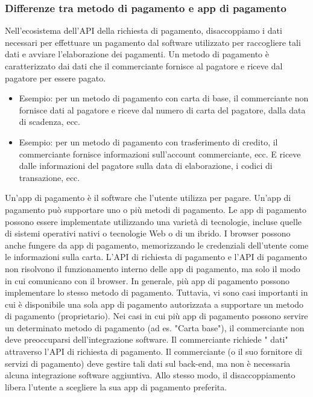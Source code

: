 \documentclass[italian]{article}
\begin{document}
	
	\subsubsection{Differenze tra metodo di pagamento e app di pagamento}
	Nell'ecosistema dell'API della richiesta di pagamento, disaccoppiamo i dati necessari per effettuare un pagamento dal software utilizzato per raccogliere tali dati e avviare l'elaborazione dei pagamenti.
	Un metodo di pagamento è caratterizzato dai dati che il commerciante fornisce al pagatore e riceve dal pagatore per essere pagato.
	\begin{itemize}
	\item Esempio: per un metodo di pagamento con carta di base, il commerciante non fornisce dati al pagatore e riceve dal numero di carta del pagatore, dalla data di scadenza, ecc.
	\item Esempio: per un metodo di pagamento con trasferimento di credito, il commerciante fornisce informazioni sull'account commerciante, ecc. E riceve dalle informazioni del pagatore sulla data di elaborazione, i codici di transazione, ecc.
	\end{itemize}
	Un'app di pagamento è il software che l'utente utilizza per pagare. Un'app di pagamento può supportare uno o più metodi di pagamento. Le app di pagamento possono essere implementate utilizzando una varietà di tecnologie, incluse quelle di sistemi operativi nativi o tecnologie Web o di un ibrido. I browser possono anche fungere da app di pagamento, memorizzando le credenziali dell'utente come le informazioni sulla carta. L'API di richiesta di pagamento e l'API di pagamento non risolvono il funzionamento interno delle app di pagamento, ma solo il modo in cui comunicano con il browser.
	In generale, più app di pagamento possono implementare lo stesso metodo di pagamento. Tuttavia, vi sono casi importanti in cui è disponibile una sola app di pagamento autorizzata a supportare un metodo di pagamento (proprietario).
	Nei casi in cui più app di pagamento possono servire un determinato metodo di pagamento (ad es. "Carta base"), il commerciante non deve preoccuparsi dell'integrazione software. Il commerciante richiede " dati" attraverso l'API di richiesta di pagamento. Il commerciante (o il suo fornitore di servizi di pagamento) deve gestire tali dati sul back-end, ma non è necessaria alcuna integrazione software aggiuntiva. Allo stesso modo, il disaccoppiamento libera l'utente a scegliere la sua app di pagamento preferita.
	
\end{document}
